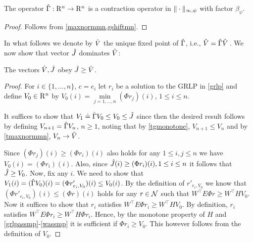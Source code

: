 \begin{comment}
\begin{theorem}\label{gmaxcontramn}
The operator $\Gamma  \colon \R^n\ra \R^n$ is a contraction operator in $\norm{\cdot}_{\mn}$ with factor $\beta_{\psi}$.
\end{theorem}
\end{comment}
\begin{theorem}\label{hgmaxcontramn}
The operator $\hat{\Gamma}:\mathrm{R}^n\to\mathrm{R}^n$  is a contraction operator in $\|\cdot\|_{\infty,\psi}$ with factor $\beta_{\psi}$.
\end{theorem}
\begin{proof}
Follows from \cref{maxnormmn,gshiftmn}.
\begin{comment}
We already know that $\hg$ is monotone. That $\hg$ satisfies~\cref{eq:shiftmn}
with $\beta = \beta_{\psi}$ follows similarly to the argument used in  \cref{tgshift}
with modifications similar to those introduced in the proof of \cref{gshiftmn}.
Then, \cref{gmaxcontramn} gives the desired result.
\end{comment}
\end{proof}
In what follows we denote by $\hat{V}$ the unique fixed point of $\hat{\Gamma}$, i.e., $\hat{V} = \hat{\Gamma} \hat{V}\,$. 
We now show that vector $\hat{J}$ dominates $\hat{V}$:
\begin{lemma}\label{relation1}
The vectors $\hat{V},\hat{J}$ obey $\hat{J}\geq\hat{V}$.
\end{lemma}
\begin{proof}
For $i\in \{1,\dots,n\}$, $c=e_i$ let $r_i$ be a solution to the GRLP in \eqref{grlp}
and define $V_0\in \mathrm{R}^n$ by $V_0(i)=\underset{j=1,\ldots,n}{\min}(\Phi r_j)(i)$, $1\le i \le n$.

It suffices to show that $V_1\doteq \hat{\Gamma} V_0 \le V_0 \le \hat{J}$ since then the desired result follows
by defining $V_{n+1} = \hat{\Gamma} V_n$, $n\ge 1$, noting that by \cref{tgmonotone}, $V_{n+1}\le V_{n}$ and by  \cref{tmaxnormmn}, $V_n \to \hat{V}$.

Since $(\Phi r_j)(i) \ge (\Phi r_i)(i)$ also holds for any $1\leq i,j\leq n$ we have $V_0(i)  = (\Phi r_i)(i)$. Also, since $\hat{J}(i) \ge (\Phi r_i)(i),1\leq i \leq n$ it follows that $\hat{J}\geq V_0$. 
Now,  fix any $i$. 
We need to show that $V_1(i)=(\hat{\Gamma} V_0)(i) = (\Phi r'_{e_i,V_0})(i) \leq V_0(i)$. 
By the definition of $r'_{e_i,V_0}$ we know that $(\Phi r'_{e_i,V_0})(i) \le (\Phi r)(i)$
holds for any $r\in \mathcal{N}$ such that $W^\top E \Phi r \ge W^\top H V_0$. 
Now it suffices to show that $r_i$ satisfies $W^\top E \Phi r_i \ge W^\top H V_0$. 
By definition, $r_i$ satisfies $W^\top E \Phi r_i \ge W^\top H \Phi r_i$.
Hence, by the monotone property of $H$ and \cref{grlpassmp}-\eqref{wassmp} it is sufficient if $\Phi r_i \ge V_0$.
This however follows from the definition of $V_0$.
\end{proof}
